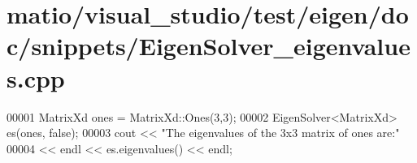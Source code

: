 \hypertarget{matio_2visual__studio_2test_2eigen_2doc_2snippets_2_eigen_solver__eigenvalues_8cpp_source}{}\section{matio/visual\+\_\+studio/test/eigen/doc/snippets/\+Eigen\+Solver\+\_\+eigenvalues.cpp}
\label{matio_2visual__studio_2test_2eigen_2doc_2snippets_2_eigen_solver__eigenvalues_8cpp_source}

\begin{DoxyCode}
00001 MatrixXd ones = MatrixXd::Ones(3,3);
00002 EigenSolver<MatrixXd> es(ones, \textcolor{keyword}{false});
00003 cout << \textcolor{stringliteral}{"The eigenvalues of the 3x3 matrix of ones are:"} 
00004      << endl << es.eigenvalues() << endl;
\end{DoxyCode}
